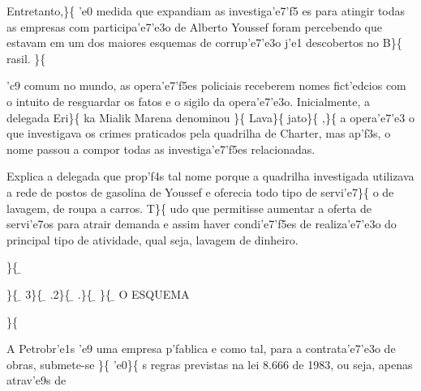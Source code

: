 Entretanto,\}\{\rtlch{}  \ltrch{}
 'e0 medida que expandiam as
investiga'e7'f5 es para atingir todas as empresas com participa'e7'e3o
de Alberto Youssef foram percebendo que estavam em um dos maiores
esquemas de corrup'e7'e3o j'e1 descobertos no B\}\{\rtlch{} 
\ltrch{}  rasil. \}\{\rtlch{}  \ltrch{}
 \par \tab 'c9 comum no mundo, as
opera'e7'f5es policiais receberem nomes fict'edcios com o intuito de
resguardar os fatos e o sigilo da opera'e7'e3o. Inicialmente, a delegada
Eri\}\{\rtlch{}  \ltrch{}  ka Mialik Marena
denominou \}\{ \rtlch{}  \ltrch{} 
Lava\}\{\rtlch{}  \ltrch{} 
jato\}\{\rtlch{}  \ltrch{}  ,\}\{\rtlch{}
 \ltrch{}  a opera'e7'e3 o que
investigava os crimes praticados pela quadrilha de Charter, mas ap'f3s,
o nome passou a compor todas as investiga'e7'f5es relacionadas.
\par \tab Explica a delegada que prop'f4s tal nome porque a quadrilha
investigada utilizava a rede de postos de gasolina de Youssef e oferecia
todo tipo de servi'e7\}\{\rtlch{}  \ltrch{}  o
de lavagem, de roupa a carros. T\}\{ \rtlch{}  \ltrch{}
 udo que permitisse aumentar a oferta de
servi'e7os para atrair demanda e assim haver condi'e7'f5es de
realiza'e7'e3o do principal tipo de atividade, qual seja, lavagem de
dinheiro. \par \}\{\rtlch{} \ab{} \ltrch{} \b{}
\par \}\{\rtlch{} \ab{} \ltrch{}
\b{} 3\}\{\rtlch{} \ab{}
\ltrch{} \b{} .2\}\{\rtlch{}
\ab{} \ltrch{} \b{} .\}\{\rtlch{}
\ab{} \ltrch{} \b{}
\}\{\rtlch{} \ab{} \ltrch{}
\b{} O ESQUEMA \par \}\{\rtlch{}
 \ltrch{}  \par \tab A
Petrobr'e1s 'e9 uma empresa p'fablica e como tal, para a contrata'e7'e3o
de obras, submete-se \}\{\rtlch{}  \ltrch{} 
'e0\}\{\rtlch{}  \ltrch{}  s
regras previstas na lei 8.666 de 1983, ou seja, apenas atrav'e9s de

